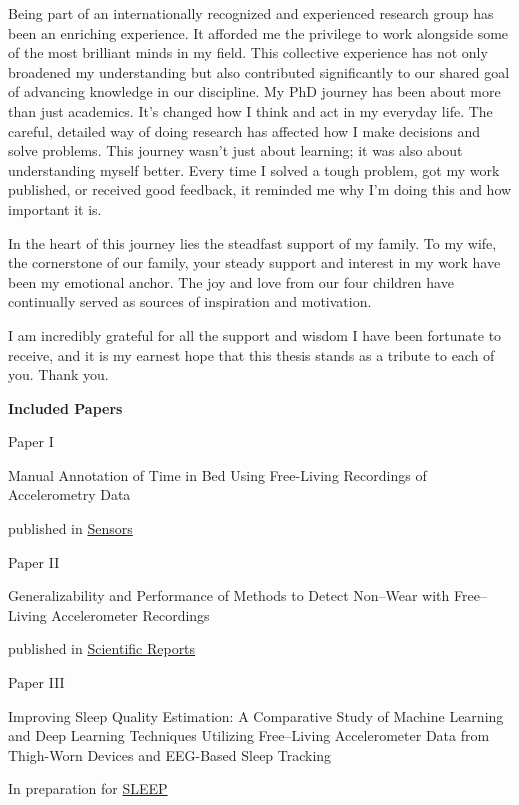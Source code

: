 \documentclass[
  10pt,
]{scrbook}
\let\originaltextbf\textbf
\renewcommand{\textbf}[1]{\textcolor{color1}{\textsf{\originaltextbf{#1}}}}
\newcommand{\aftertocpagenum}{
   \cleardoublepage
   \pagenumbering{arabic}
 }
\renewcommand*\contentsname{Table of contents}
\newcommand\contentsname{Table of contents}
\begin{document}
Being part of an internationally recognized and experienced research group has been an enriching experience. It afforded me the privilege to work alongside some of the most brilliant minds in my field. This collective experience has not only broadened my understanding but also contributed significantly to our shared goal of advancing knowledge in our discipline.
My PhD journey has been about more than just academics. It's changed how I think and act in my everyday life. The careful, detailed way of doing research has affected how I make decisions and solve problems. This journey wasn't just about learning; it was also about understanding myself better. Every time I solved a tough problem, got my work published, or received good feedback, it reminded me why I'm doing this and how important it is.

In the heart of this journey lies the steadfast support of my family. To my wife, the cornerstone of our family, your steady support and interest in my work have been my emotional anchor. The joy and love from our four children have continually served as sources of inspiration and motivation.

I am incredibly grateful for all the support and wisdom I have been fortunate to receive, and it is my earnest hope that this thesis stands as a tribute to each of you. Thank you.

\newpage

\textcolor{color1}{\textsf{\textbf{\Large{Included Papers}}}}

\vspace{2cm}

\begin{center}

Paper I

\textsf{Manual Annotation of Time in Bed Using Free-Living Recordings of Accelerometry Data}

published in \href{https://doi.org/10.3390/s21248442}{Sensors}

\vspace{2cm}
Paper II

\textsf{Generalizability and Performance of Methods to Detect Non–Wear with Free–Living Accelerometer Recordings}

published in \href{https://doi.org/10.1038/s41598-023-29666-x}{Scientific Reports}

\vspace{2cm}
Paper III 

\textsf{Improving Sleep Quality Estimation: A Comparative Study of Machine Learning and Deep Learning Techniques Utilizing Free–Living Accelerometer Data from Thigh-Worn Devices and EEG-Based Sleep Tracking}

In preparation for \href{https://academic.oup.com/sleep}{SLEEP}

\end{center}\renewcommand*\contentsname{Table of contents}
{
\hypersetup{linkcolor=}
\setcounter{tocdepth}{2}
\tableofcontents
}
\listoffigures
\listoftables
\mainmatter
\aftertocpagenum
\end{document}

